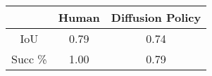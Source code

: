 \small
\begin{tabular}{c|c|c}
\toprule
         & Human & Diffusion Policy \\
\midrule
IoU & 0.79  & 0.74             \\
Succ \%   & 1.00  & 0.79            \\
\bottomrule
\end{tabular}
